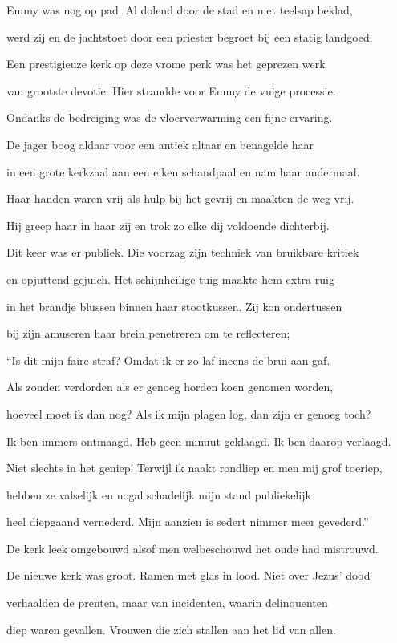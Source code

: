 Emmy was nog op pad.
Al dolend door de stad
en met teelsap beklad,

werd zij en de jachtstoet
door een priester begroet
bij een statig landgoed.

Een prestigieuze kerk
op deze vrome perk
was het geprezen werk

van grootste devotie.
Hier strandde voor Emmy
de vuige processie.

Ondanks de bedreiging
was de vloerverwarming
een fijne ervaring.

De jager boog aldaar
voor een antiek altaar
en benagelde haar

in een grote kerkzaal
aan een eiken schandpaal
en nam haar andermaal.

Haar handen waren vrij
als hulp bij het gevrij
en maakten de weg vrij.

Hij greep haar in haar zij
en trok zo elke dij
voldoende dichterbij.

Dit keer was er publiek.
Die voorzag zijn techniek
van bruikbare kritiek

en opjuttend gejuich.
Het schijnheilige tuig
maakte hem extra ruig

in het brandje blussen
binnen haar stootkussen.
Zij kon ondertussen

bij zijn amuseren
haar brein penetreren
om te reflecteren;

“Is dit mijn faire straf?
Omdat ik er zo laf
ineens de brui aan gaf.

Als zonden verdorden
als er genoeg horden
koen genomen worden,

hoeveel moet ik dan nog?
Als ik mijn plagen log,
dan zijn er genoeg toch?

Ik ben immers ontmaagd.
Heb geen minuut geklaagd.
Ik ben daarop verlaagd.

Niet slechts in het geniep!
Terwijl ik naakt rondliep
en men mij grof toeriep,

hebben ze valselijk
en nogal schadelijk
mijn stand publiekelijk

heel diepgaand vernederd.
Mijn aanzien is sedert
nimmer meer gevederd.”

De kerk leek omgebouwd
alsof men welbeschouwd
het oude had mistrouwd.

De nieuwe kerk was groot.
Ramen met glas in lood.
Niet over Jezus’ dood

verhaalden de prenten,
maar van incidenten,
waarin delinquenten

diep waren gevallen.
Vrouwen die zich stallen
aan het lid van allen.

